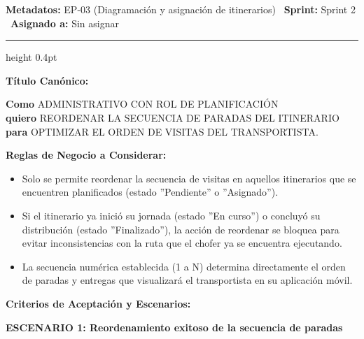 \documentclass[a4paper,9pt]{article}
\begin{document}
\begin{tcolorbox}[hucard, title={\textbf{HU-59: REORDENAR SECUENCIA DE PARADAS DEL ITINERARIO} \hfill \scriptsize \colorbox{tealstatus}{\textbf{\ Accepted\ }} \quad \colorbox{white}{\textcolor{primarydark}{\textbf{\ 3 pts\ }}}}]
\vspace{-1pt}
\noindent\textbf{\footnotesize Metadatos:} EP-03 (Diagramación y asignación de itinerarios) \textbar\ \textbf{Sprint:} Sprint 2 \textbar\ \textbf{Asignado a:} Sin asignar\par\vspace{2pt}
\hrule height 0.4pt\par\vspace{3pt}
\noindent\textbf{\footnotesize Título Canónico:}\par\vspace{1pt}
{\small \textbf{Como} ADMINISTRATIVO CON ROL DE PLANIFICACIÓN \\ \textbf{quiero} REORDENAR LA SECUENCIA DE PARADAS DEL ITINERARIO \\ \textbf{para} OPTIMIZAR EL ORDEN DE VISITAS DEL TRANSPORTISTA.}\par\vspace{3pt}
\noindent\textbf{\footnotesize Reglas de Negocio a Considerar:}\par\vspace{1pt}
{\footnotesize
\begin{itemize}[leftmargin=12pt, nosep, itemsep=1.5pt, topsep=1pt]
\item Solo se permite reordenar la secuencia de visitas en aquellos itinerarios que se encuentren planificados (estado ''Pendiente'' o ''Asignado'').
\item Si el itinerario ya inició su jornada (estado ''En curso'') o concluyó su distribución (estado ''Finalizado''), la acción de reordenar se bloquea para evitar inconsistencias con la ruta que el chofer ya se encuentra ejecutando.
\item La secuencia numérica establecida (1 a N) determina directamente el orden de paradas y entregas que visualizará el transportista en su aplicación móvil.
\end{itemize}
}\par\vspace{3pt}
\noindent\textbf{\footnotesize Criterios de Aceptación y Escenarios:}\par\vspace{2pt}
{\footnotesize
\noindent\textbf{\textcolor{secondarydark}{ESCENARIO 1:  Reordenamiento exitoso de la secuencia de paradas}}\par\vspace{1pt}
}
\end{tcolorbox}
\end{document}
